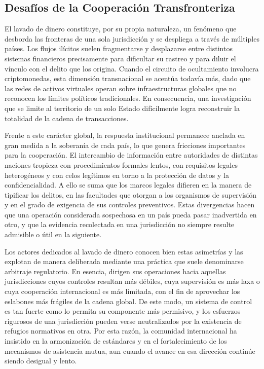 \subsection{Desafíos de la Cooperación Transfronteriza}

El lavado de dinero constituye, por su propia naturaleza, un fenómeno que desborda las fronteras de una sola jurisdicción y se despliega a través de múltiples países. Los flujos ilícitos suelen fragmentarse y desplazarse entre distintos sistemas financieros precisamente para dificultar su rastreo y para diluir el vínculo con el delito que los origina. Cuando el circuito de ocultamiento involucra criptomonedas, esta dimensión transnacional se acentúa todavía más, dado que las redes de activos virtuales operan sobre infraestructuras globales que no reconocen los límites políticos tradicionales. En consecuencia, una investigación que se limite al territorio de un solo Estado difícilmente logra reconstruir la totalidad de la cadena de transacciones.

Frente a este carácter global, la respuesta institucional permanece anclada en gran medida a la soberanía de cada país, lo que genera fricciones importantes para la cooperación. El intercambio de información entre autoridades de distintas naciones tropieza con procedimientos formales lentos, con requisitos legales heterogéneos y con celos legítimos en torno a la protección de datos y la confidencialidad. A ello se suma que los marcos legales difieren en la manera de tipificar los delitos, en las facultades que otorgan a los organismos de supervisión y en el grado de exigencia de sus controles preventivos. Estas divergencias hacen que una operación considerada sospechosa en un país pueda pasar inadvertida en otro, y que la evidencia recolectada en una jurisdicción no siempre resulte admisible o útil en la siguiente.

Los actores dedicados al lavado de dinero conocen bien estas asimetrías y las explotan de manera deliberada mediante una práctica que suele denominarse arbitraje regulatorio. En esencia, dirigen sus operaciones hacia aquellas jurisdicciones cuyos controles resultan más débiles, cuya supervisión es más laxa o cuya cooperación internacional es más limitada, con el fin de aprovechar los eslabones más frágiles de la cadena global. De este modo, un sistema de control es tan fuerte como lo permita su componente más permisivo, y los esfuerzos rigurosos de una jurisdicción pueden verse neutralizados por la existencia de refugios normativos en otra. Por esta razón, la comunidad internacional ha insistido en la armonización de estándares y en el fortalecimiento de los mecanismos de asistencia mutua, aun cuando el avance en esa dirección continúe siendo desigual y lento.


